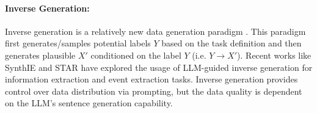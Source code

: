 \paragraph{Inverse Generation:}
Inverse generation is a relatively new data generation paradigm \cite{kumar-etal-2020-data, schick-schutze-2021-generating}.
This paradigm first generates/samples potential labels $Y$ based on the task definition and then generates plausible $X'$ conditioned on the label $Y$ (i.e. $Y \rightarrow X'$).
Recent works like SynthIE \cite{josifoski-etal-2023-exploiting} and STAR \cite{star} have explored the usage of LLM-guided inverse generation for information extraction and event extraction tasks.
Inverse generation provides control over data distribution via prompting, but the data quality is dependent on the LLM's sentence generation capability.





